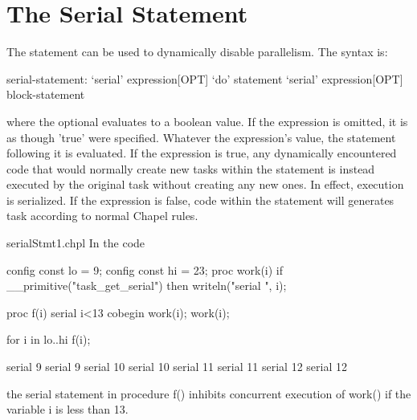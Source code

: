 \section{The Serial Statement}
\label{Serial}

The  statement can be used to dynamically disable
parallelism.  The syntax is:
\begin{syntax}
serial-statement:
  `serial' expression[OPT] `do' statement
  `serial' expression[OPT] block-statement
\end{syntax}
where the optional  evaluates to a boolean value.  If
the expression is omitted, it is as though 'true' were specified.
Whatever the expression's value, the statement following it is
evaluated. If the expression is true, any dynamically encountered code
that would normally create new tasks within the statement is instead
executed by the original task without creating any new ones.  In
effect, execution is serialized.  If the expression is false, code
within the statement will generates task according to normal Chapel
rules.

\begin{chapelexample}{serialStmt1.chpl}
In the code
\begin{chapelpre}
config const lo = 9;
config const hi = 23;
proc work(i) {
  if \_\_primitive("task\_get\_serial") then
    writeln("serial ", i);
}
\end{chapelpre}
\begin{chapel}
proc f(i) {
  serial i<13 {
    cobegin {
      work(i);
      work(i);
    }
  }
}

for i in lo..hi {
  f(i);
}
\end{chapel}
\begin{chapelpost}
\end{chapelpost}
\begin{chapeloutput}
serial 9
serial 9
serial 10
serial 10
serial 11
serial 11
serial 12
serial 12
\end{chapeloutput}
the serial statement in procedure f() inhibits concurrent execution of
work() if the variable i is less than 13.
\end{chapelexample}

